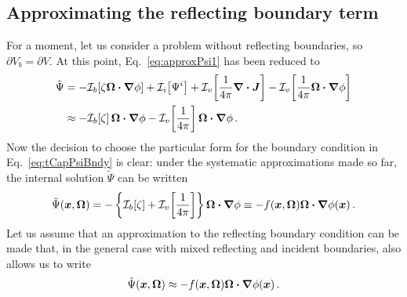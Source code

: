 \subsection{Approximating the reflecting boundary term}\label{sec:derReflBc}
For a moment, let us consider a problem without reflecting boundaries, so
$\partial V_b = \partial V$. At this point, Eq.~\eqref{eq:approxPsi1} has been
reduced to
\begin{align*}
  \tilde\Psi
  &= -\mathcal{I}_{b}\!\left[\zeta \bm{\Omega}\bm{\cdot} \bm{\nabla} \phi\right]
    + \mathcal{I}_{i}\!\left[\Psi^i\right]
    + \mathcal{I}_{v}\!\left[\frac{1}{4\pi} \bm{\nabla} \bm{\cdot}\bm{J} \right]
    - \mathcal{I}_{v}\!\left[\frac{1}{4\pi} \bm{\Omega}\bm{\cdot} \bm{\nabla} \phi\right]
\\
  &\approx
  -\mathcal{I}_{b}\!\left[\zeta\right] \bm{\Omega}\bm{\cdot} \bm{\nabla} \phi
  - \mathcal{I}_{v}\!\left[\frac{1}{4\pi}\right] \bm{\Omega}\bm{\cdot} \bm{\nabla} \phi \,.
\end{align*}
Now the decision to choose the particular form for the boundary condition in
Eq.~\eqref{eq:tCapPsiBndy}
is clear: under the systematic approximations made so far, the internal solution
$\tilde\Psi$ can be written
\begin{equation*}
  \tilde\Psi(\bm{x}, \bm{\Omega})
  = - \left\{ \mathcal{I}_{b}\!\left[\zeta\right] + \mathcal{I}_{v}\!\left[\frac{1}{4\pi}\right]
  \right\} \bm{\Omega}\bm{\cdot} \bm{\nabla} \phi
  \equiv - f(\bm{x}, \bm{\Omega}) \bm{\Omega}\bm{\cdot} \bm{\nabla} \phi(\bm{x})\,.
\end{equation*}
Let us assume that an approximation to the reflecting boundary condition can
be made that, in the general case with mixed reflecting and incident
boundaries, also allows us to write 
\begin{equation*}
  \tilde\Psi(\bm{x}, \bm{\Omega})
  \approx - f(\bm{x}, \bm{\Omega}) \bm{\Omega}\bm{\cdot} \bm{\nabla} \phi(\bm{x})\,.
\end{equation*}

